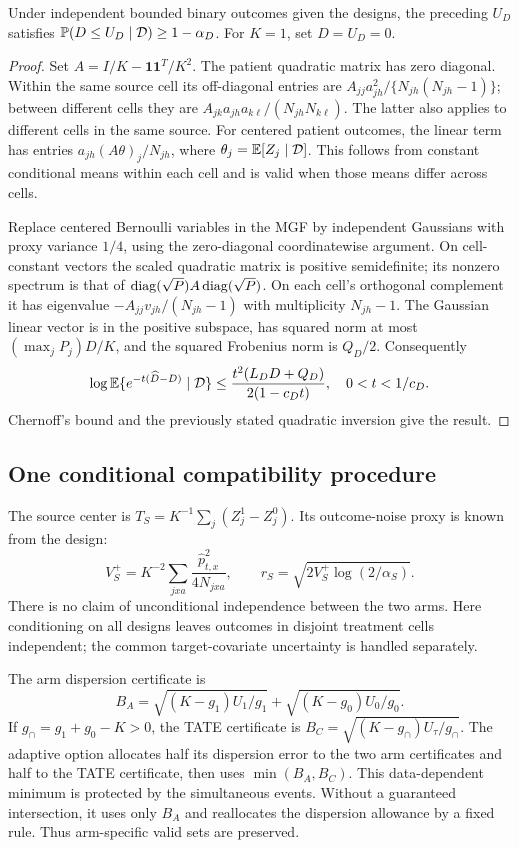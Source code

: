 \begin{proposition}
Under independent bounded binary outcomes given the designs, the preceding
$U_D$ satisfies $\mathbb P(D\le U_D\mid\mathcal D)\ge1-\alpha_D$.
For $K=1$, set $D=U_D=0$.
\end{proposition}
\begin{proof}
Set $A=I/K-\boldsymbol1\boldsymbol1^T/K^2$. The patient quadratic matrix has
zero diagonal. Within the same source cell its off-diagonal entries are
$A_{jj}a_{jh}^2/\{N_{jh}(N_{jh}-1)\}$; between different cells they are
$A_{jk}a_{jh}a_{k\ell}/(N_{jh}N_{k\ell})$.
The latter also applies to different cells in the same source.
For centered patient outcomes, the linear term has entries
$a_{jh}(A\theta)_j/N_{jh}$, where $\theta_j=\mathbb E[Z_j\mid\mathcal D]$.
This follows from constant conditional means within each cell and is valid
when those means differ across cells.

Replace centered Bernoulli variables in the MGF by independent Gaussians with
proxy variance $1/4$, using the zero-diagonal coordinatewise argument.
On cell-constant vectors the scaled quadratic matrix is positive semidefinite;
its nonzero spectrum is that of
$\operatorname{diag}(\sqrt P)A\operatorname{diag}(\sqrt P)$. On each cell's orthogonal complement it
has eigenvalue $-A_{jj}v_{jh}/(N_{jh}-1)$ with multiplicity $N_{jh}-1$.
The Gaussian linear vector is in the positive subspace, has squared norm at
most $(\max_jP_j)D/K$, and the squared Frobenius norm is $Q_D/2$.
Consequently
\[
 \log\mathbb E\{e^{-t(\widehat D-D)}\mid\mathcal D\}
 \le \frac{t^2(L_DD+Q_D)}{2(1-c_Dt)},\quad 0<t<1/c_D.
\]
Chernoff's bound and the previously stated quadratic inversion give the result.
\end{proof}

\subsection{One conditional compatibility procedure}

The source center is $T_S=K^{-1}\sum_j(Z_j^1-Z_j^0)$. Its outcome-noise
proxy is known from the design:
\[
 V_S^+=K^{-2}\sum_{jxa}\frac{\hat p_{t,x}^2}{4N_{jxa}},\qquad
 r_S=\sqrt{2V_S^+\log(2/\alpha_S)}.
\]
There is no claim of unconditional independence between the two arms. Here
conditioning on all designs leaves outcomes in disjoint treatment cells
independent; the common target-covariate uncertainty is handled separately.

The arm dispersion certificate is
\[
 B_A=\sqrt{(K-g_1)U_1/g_1}+\sqrt{(K-g_0)U_0/g_0}.
\]
If $g_\cap=g_1+g_0-K>0$, the TATE certificate is
$B_C=\sqrt{(K-g_\cap)U_\tau/g_\cap}$. The adaptive option allocates half
its dispersion error to the two arm certificates and half to the TATE
certificate, then uses $\min(B_A,B_C)$. This data-dependent minimum is
protected by the simultaneous events. Without a guaranteed intersection,
it uses only $B_A$ and reallocates the dispersion allowance by a fixed rule.
Thus arm-specific valid sets are preserved.

